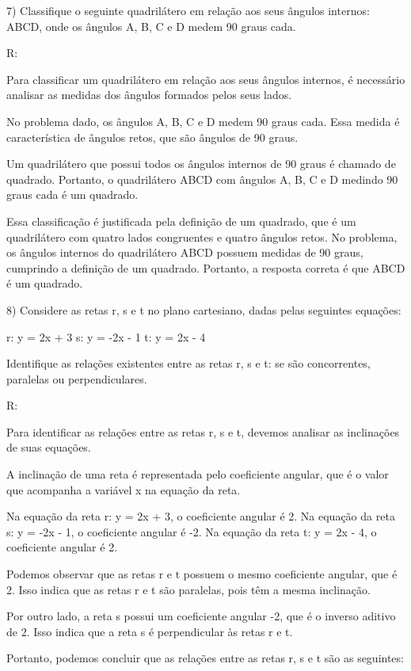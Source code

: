 7) Classifique o seguinte quadrilátero em relação aos seus ângulos
internos: ABCD, onde os ângulos A, B, C e D medem 90 graus cada.

R:

Para classificar um quadrilátero em relação aos seus ângulos internos, é
necessário analisar as medidas dos ângulos formados pelos seus lados.

No problema dado, os ângulos A, B, C e D medem 90 graus cada. Essa
medida é característica de ângulos retos, que são ângulos de 90 graus.

Um quadrilátero que possui todos os ângulos internos de 90 graus é
chamado de quadrado. Portanto, o quadrilátero ABCD com ângulos A, B, C e
D medindo 90 graus cada é um quadrado.

Essa classificação é justificada pela definição de um quadrado, que é um
quadrilátero com quatro lados congruentes e quatro ângulos retos. No
problema, os ângulos internos do quadrilátero ABCD possuem medidas de 90
graus, cumprindo a definição de um quadrado. Portanto, a resposta
correta é que ABCD é um quadrado.

8) Considere as retas r, s e t no plano cartesiano, dadas pelas
seguintes equações:

r: y = 2x + 3 s: y = -2x - 1 t: y = 2x - 4

Identifique as relações existentes entre as retas r, s e t: se são
concorrentes, paralelas ou perpendiculares.

R:

Para identificar as relações entre as retas r, s e t, devemos analisar
as inclinações de suas equações.

A inclinação de uma reta é representada pelo coeficiente angular, que é
o valor que acompanha a variável x na equação da reta.

Na equação da reta r: y = 2x + 3, o coeficiente angular é 2. Na equação
da reta s: y = -2x - 1, o coeficiente angular é -2. Na equação da reta
t: y = 2x - 4, o coeficiente angular é 2.

Podemos observar que as retas r e t possuem o mesmo coeficiente angular,
que é 2. Isso indica que as retas r e t são paralelas, pois têm a mesma
inclinação.

Por outro lado, a reta s possui um coeficiente angular -2, que é o
inverso aditivo de 2. Isso indica que a reta s é perpendicular às retas
r e t.

Portanto, podemos concluir que as relações entre as retas r, s e t são
as seguintes:

